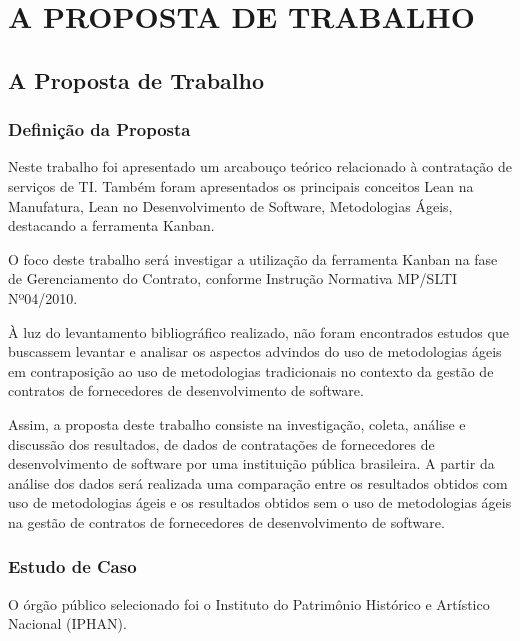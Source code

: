 \part{A PROPOSTA DE TRABALHO}

\chapter[A Proposta de Trabalho]{A Proposta de Trabalho}

\section[Definição da Proposta]{Definição da Proposta}

Neste trabalho foi apresentado um arcabouço teórico relacionado à contratação de serviços de TI. Também foram apresentados os principais conceitos Lean na Manufatura, Lean no Desenvolvimento de Software, Metodologias Ágeis, destacando a ferramenta Kanban.

O foco deste trabalho será investigar a utilização da ferramenta Kanban na fase de Gerenciamento do Contrato, conforme Instrução Normativa MP/SLTI Nº04/2010.

À luz do levantamento bibliográfico realizado, não foram encontrados estudos que buscassem levantar e analisar os aspectos advindos do uso de metodologias ágeis em contraposição ao uso de metodologias tradicionais no contexto da gestão de contratos de fornecedores de desenvolvimento de software.

Assim, a proposta deste trabalho consiste na investigação, coleta, análise e discussão dos resultados, de dados de contratações de fornecedores de desenvolvimento de software por uma instituição pública brasileira. A partir da análise  dos dados será realizada uma comparação entre os resultados obtidos com uso de metodologias ágeis e os resultados obtidos sem o uso de metodologias ágeis na gestão de contratos de fornecedores de desenvolvimento de software.

\section[Estudo de Caso]{Estudo de Caso}

O órgão público selecionado foi o Instituto do Patrimônio Histórico e Artístico Nacional (IPHAN).

